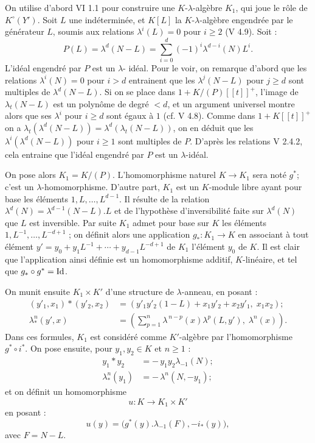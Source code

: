 On utilise d'abord VI 1.1 pour construire une \(K\)-\(\lambda\)-algèbre \(K_1\), qui joue le rôle de \(K^\circ(Y')\). Soit \(L\) une indéterminée, et \(K[L]\) la \(K\)-\(\lambda\)-algèbre engendrée par le générateur \(L\), soumis aux relations \(\lambda^i(L)=0\) pour \(i\ge2\) (V 4.9). Soit :
\[
  P(L)=\lambda^d(N-L)=\sum_{i=0}^{d}(-1)^i\lambda^{d-i}(N)L^i.
\]
L'idéal engendré par \(P\) est un \(\lambda\)-
idéal. Pour le voir, on remarque d'abord que les relations \(\lambda^i(N)=0\) pour \(i>d\) entrainent que les \(\lambda^j(N-L)\) pour \(j\ge d\) sont multiples de \(\lambda^d(N-L)\). Si on se place dans \(1+K/(P)[[t]]^+\), l'image de \(\lambda_t(N-L)\) est un polynôme de degré \(<d\), et un argument universel montre alors que ses \(\lambda^i\) pour \(i\ge d\) sont égaux à \(1\) (cf. V 4.8). Comme dans \(1+K[[t]]^+\) on a \(\lambda_t(\lambda^d(N-L))=\lambda^d(\lambda_t(N-L))\), on en déduit que les \(\lambda^i(\lambda^d(N-L))\) pour \(i\ge1\) sont multiples de \(P\). D'après les relations V 2.4.2, cela entraine que l'idéal engendré par \(P\) est un \(\lambda\)-idéal.

On pose alors \(K_1=K/(P)\). L'homomorphisme naturel \(K\to K_1\) sera noté \(g^*\); c'est un \(\lambda\)-homomorphisme. D'autre part, \(K_1\) est un \(K\)-module libre ayant pour base les éléments \(1,L,\ldots,L^{d-1}\). Il résulte de la relation \(\lambda^d(N)=\lambda^{d-1}(N-L).L\) et de l'hypothèse d'inversibilité faite sur \(\lambda^d(N)\) que \(L\) est inversible. Par suite \(K_1\) admet pour base sur \(K\) les éléments \(1,L^{-1},\ldots,L^{-d+1}\) ; on définit alors une application \(g_*:K_1\to K\) en associant à tout élément \(y'=y_0+y_1L^{-1}+\cdots+y_{d-1}L^{-d+1}\) de \(K_1\) l'élément \(y_0\) de \(K\). Il est clair que l'application ainsi définie est un homomorphisme additif, \(K\)-linéaire, et tel que \(g_*\circ g^*=\operatorname{Id}\).

On munit ensuite \(K_1\times K'\) d'une structure de \(\lambda\)-anneau, en posant :
\begin{align}
 (y'_1,x_1)*(y'_2,x_2)
   &=(y'_1y'_2(1-L)+x_1y'_2+x_2y'_1,\; x_1x_2); \tag{4.7.1}\\
 \lambda^n_*(y',x)
   &=\left(\sum_{p=1}^{n}\lambda^{\,n-p}(x)\lambda^p(L,y'),\;
     \lambda^n(x)\right). \tag{4.7.2}
\end{align}
Dans ces formules, \(K_1\) est considéré comme \(K'\)-algèbre par l'homomorphisme \(g^*\circ i^*\).
On pose ensuite, pour \(y_1,y_2\in K\) et \(n\ge1\) :
\begin{align}
 y_1*y_2&=-\,y_1y_2\lambda_{-1}(N); \tag{4.7.3}\\
 \lambda^n_*(y_1)&=-\,\lambda^n(N,-y_1); \tag{4.7.4}
\end{align}
et on
définit un homomorphisme
\[
  u:K\longrightarrow K_1\times K'
\]
en posant :
\[
  u(y)=\bigl(g^*(y).\lambda_{-1}(F),-i_*(y)\bigr),
\]
avec \(F=N-L\).

